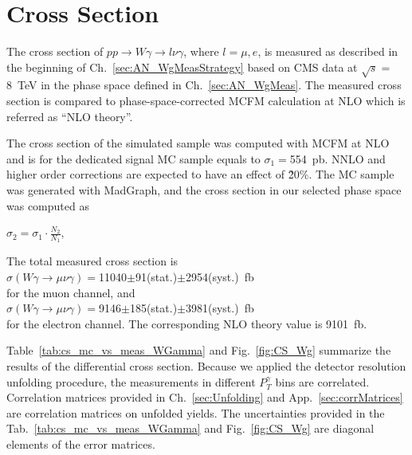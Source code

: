 \section{Cross Section}
\label{sec:AN_CrossSection}

The cross section of $pp\rightarrow W\gamma \rightarrow l\nu\gamma$, where $l=\mu,e$, is measured as described in the beginning of Ch.~\ref{sec:AN_WgMeasStrategy} based on CMS data at $\sqrt{s}=$8~TeV in the phase space defined in  Ch.~\ref{sec:AN_WgMeas}. The measured cross section is compared to phase-space-corrected MCFM calculation at NLO which is referred as ``NLO theory''.  

The cross section of the simulated sample was computed with MCFM at NLO and is for the dedicated signal MC sample equals to $\sigma_1=$554~pb. NNLO and higher order corrections are expected to have an effect of \~20\%. The MC sample was generated with MadGraph, and the cross section in our selected phase space was computed as 
\begin{center}
$\sigma_2 = \sigma_1 \cdot \frac{N_2}{N_1}$, 
\end{center} 


The total measured cross section is \\
$\sigma(W\gamma\rightarrow\mu\nu\gamma)=$11040$\pm$91(stat.)$\pm$2954(syst.)~fb\\
for the muon channel, and \\
$\sigma(W\gamma\rightarrow\mu\nu\gamma)=$9146$ \pm $185(stat.)$\pm$3981(syst.)~fb\\
for the electron channel. The corresponding NLO theory value is 9101~fb.


Table~\ref{tab:cs_mc_vs_meas_WGamma} and Fig.~\ref{fig:CS_Wg} summarize the results of the differential cross section. Because we applied the detector resolution unfolding procedure, the measurements in different $P_T^{\gamma}$ bins are correlated. Correlation matrices provided in Ch.~\ref{sec:Unfolding} and App.~\ref{sec:corrMatrices} are correlation matrices on unfolded yields. The uncertainties provided in the Tab.~\ref{tab:cs_mc_vs_meas_WGamma} and Fig.~\ref{fig:CS_Wg} are diagonal elements of the error matrices.

